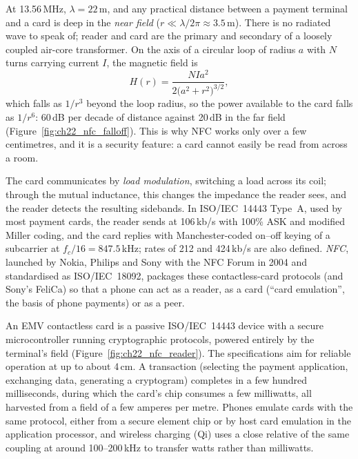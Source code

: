 At 13.56\,MHz, $\lambda=22$\,m, and any practical distance between a payment terminal and a card is
deep in the \emph{near field} ($r\ll\lambda/2\pi\approx3.5$\,m). There is no radiated wave to speak of;
reader and card are the primary and secondary of a loosely coupled air-core transformer. On the axis
of a circular loop of radius $a$ with $N$ turns carrying current $I$, the magnetic field is
\begin{equation}
H(r)=\frac{NIa^2}{2\big(a^2+r^2\big)^{3/2}},
\label{eq:ch22:nfcfield}
\end{equation}
which falls as $1/r^3$ beyond the loop radius, so the power available to the card falls as $1/r^6$:
60\,dB per decade of distance against 20\,dB in the far field (Figure~\ref{fig:ch22_nfc_falloff}). This
is why NFC works only over a few centimetres, and it is a security feature: a card cannot easily be
read from across a room.

The card communicates by \emph{load modulation}, switching a load across its coil; through the mutual
inductance, this changes the impedance the reader sees, and the reader detects the resulting
sidebands. In ISO/IEC~14443 Type~A, used by most payment cards, the reader sends at 106\,kb/s with
100\% ASK and modified Miller coding, and the card replies with Manchester-coded on--off keying of a
subcarrier at $f_c/16=847.5$\,kHz; rates of 212 and 424\,kb/s are also defined. \emph{NFC}, launched by
Nokia, Philips and Sony with the NFC Forum in 2004 and standardised as ISO/IEC~18092, packages these
contactless-card protocols (and Sony's FeliCa) so that a phone can act as a reader, as a card (``card
emulation'', the basis of phone payments) or as a peer.


\begin{inpractice}
An EMV contactless card is a passive ISO/IEC~14443 device with a secure microcontroller running
cryptographic protocols, powered entirely by the terminal's field (Figure~\ref{fig:ch22_nfc_reader}).
The specifications aim for reliable operation at up to about 4\,cm. A transaction (selecting the
payment application, exchanging data, generating a cryptogram) completes in a few hundred
milliseconds, during which the card's chip consumes a few milliwatts, all harvested from a field of a
few amperes per metre. Phones emulate cards with the same protocol, either from a secure element chip
or by host card emulation in the application processor, and wireless charging (Qi) uses a close
relative of the same coupling at around 100--200\,kHz to transfer watts rather than milliwatts.
\end{inpractice}

